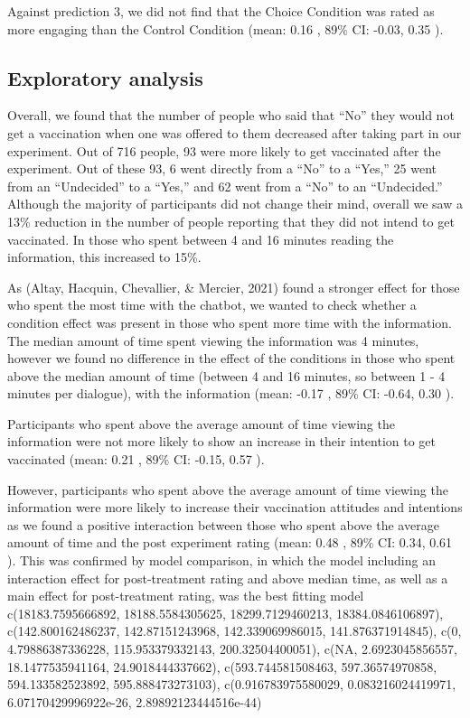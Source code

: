 \documentclass[
  english,
  ,jou,floatsintext]{apa6}
\begin{document}
Against prediction 3, we did not find that the Choice Condition was rated as more engaging than the Control Condition (mean: 0.16 , 89\% CI: -0.03, 0.35 ).

\hypertarget{exploratory-analysis}{%
\subsection{Exploratory analysis}\label{exploratory-analysis}}

Overall, we found that the number of people who said that ``No'' they would not get a vaccination when one was offered to them decreased after taking part in our experiment. Out of 716 people, 93 were more likely to get vaccinated after the experiment. Out of these 93, 6 went directly from a ``No'' to a ``Yes,'' 25 went from an ``Undecided'' to a ``Yes,'' and 62 went from a ``No'' to an ``Undecided.'' Although the majority of participants did not change their mind, overall we saw a 13\% reduction in the number of people reporting that they did not intend to get vaccinated. In those who spent between 4 and 16 minutes reading the information, this increased to 15\%.

As (Altay, Hacquin, Chevallier, \& Mercier, 2021) found a stronger effect for those who spent the most time with the chatbot, we wanted to check whether a condition effect was present in those who spent more time with the information. The median amount of time spent viewing the information was 4 minutes, however we found no difference in the effect of the conditions in those who spent above the median amount of time (between 4 and 16 minutes, so between 1 - 4 minutes per dialogue), with the information (mean: -0.17 , 89\% CI: -0.64, 0.30 ).

Participants who spent above the average amount of time viewing the information were not more likely to show an increase in their intention to get vaccinated (mean: 0.21 , 89\% CI: -0.15, 0.57 ).

However, participants who spent above the average amount of time viewing the information were more likely to increase their vaccination attitudes and intentions as we found a positive interaction between those who spent above the average amount of time and the post experiment rating (mean: 0.48 , 89\% CI: 0.34, 0.61 ). This was confirmed by model comparison, in which the model including an interaction effect for post-treatment rating and above median time, as well as a main effect for post-treatment rating, was the best fitting model c(18183.7595666892, 18188.5584305625, 18299.7129460213, 18384.0846106897), c(142.800162486237, 142.87151243968, 142.339069986015, 141.876371914845), c(0, 4.79886387336228, 115.953379332143, 200.32504400051), c(NA, 2.6923045856557, 18.1477535941164, 24.9018444337662), c(593.744581508463, 597.36574970858, 594.133582523892, 595.888473273103), c(0.916783975580029, 0.083216024419971, 6.07170429996922e-26, 2.89892123444516e-44)
\end{document}
